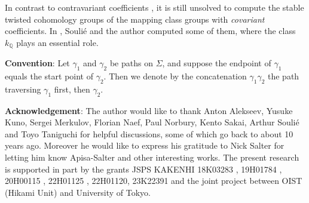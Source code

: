\documentclass[a4paper,12pt, twoside]{amsart}
\theoremstyle{definition}
\theoremstyle{remark}
\numberwithin{equation}{section}
\newcommand\bQ{{\mathbb{Q}}}
\begin{document}
In contrast to contravariant coefficients \cite{S}, it is still unsolved to compute the stable twisted cohomology groups of the mapping class groups with {\it covariant} coefficients. In \cite{KS1, KS2}, Souli\'e and the author computed some of them, where the class $k_\bQ$ plays an essential role. \par

\bigskip
\noindent
{\bf Convention}: Let $\gamma_1$ and $\gamma_2$ be paths on $\Sigma$, and suppose the endpoint of $\gamma_1$ equals the start point of $\gamma_2$. Then we denote by the concatenation $\gamma_1\gamma_2$ the path traversing $\gamma_1$ first, then $\gamma_2$. \par






\bigskip
\noindent
{\bf Acknowledgement}: 
The author would like to thank 
Anton Alekseev,
Yusuke Kuno, 
Sergei Merkulov, 
Florian Naef,
Paul Norbury, 
Kento Sakai, 
Arthur Souli\'e
and Toyo Taniguchi
for helpful discussions, some of which go back to about 10 years ago. 
%
Moreover he would like to express his gratitude to Nick Salter for letting him know Apisa-Salter \cite{ApisaSalter} and other interesting works.  
%
%
The present research is supported in part by the grants JSPS KAKENHI 
18K03283 %
, 19H01784%
, 20H00115%
, 22H01125%
, 22H01120, 23K22391 %
and the joint project between OIST (Hikami Unit) and University of Tokyo.

\tableofcontents

%
%
\end{document}
